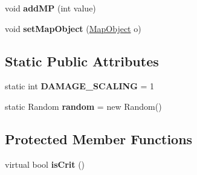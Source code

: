 \begin{DoxyCompactItemize}
\item 
\hypertarget{class_simple_r_p_g_1_1_battler_a6b8fcc1465942de295cf4d181f752048}{void {\bfseries add\-M\-P} (int value)}\label{class_simple_r_p_g_1_1_battler_a6b8fcc1465942de295cf4d181f752048}

\item 
\hypertarget{class_simple_r_p_g_1_1_battler_a2507e5abe2a5029b276df32ef9241278}{void {\bfseries set\-Map\-Object} (\hyperlink{class_simple_r_p_g_1_1_map_object}{Map\-Object} o)}\label{class_simple_r_p_g_1_1_battler_a2507e5abe2a5029b276df32ef9241278}

\end{DoxyCompactItemize}
\subsection*{Static Public Attributes}
\begin{DoxyCompactItemize}
\item 
\hypertarget{class_simple_r_p_g_1_1_battler_ac83c439f26bd3abe3dcaa24d231bbfdc}{static int {\bfseries D\-A\-M\-A\-G\-E\-\_\-\-S\-C\-A\-L\-I\-N\-G} = 1}\label{class_simple_r_p_g_1_1_battler_ac83c439f26bd3abe3dcaa24d231bbfdc}

\item 
\hypertarget{class_simple_r_p_g_1_1_battler_a65a28ffcf2263397e640d77784652df3}{static Random {\bfseries random} = new Random()}\label{class_simple_r_p_g_1_1_battler_a65a28ffcf2263397e640d77784652df3}

\end{DoxyCompactItemize}
\subsection*{Protected Member Functions}
\begin{DoxyCompactItemize}
\item 
\hypertarget{class_simple_r_p_g_1_1_battler_a57e2a41105489240317dce088fc37c0f}{virtual bool {\bfseries is\-Crit} ()}\label{class_simple_r_p_g_1_1_battler_a57e2a41105489240317dce088fc37c0f}

\end{DoxyCompactItemize}
